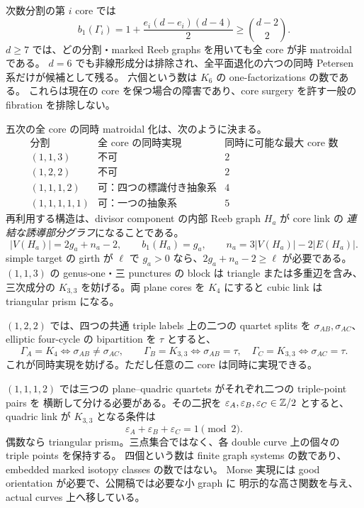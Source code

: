 \documentclass[11pt,a4paper]{article}
\begin{document}
次数分割の第 $i$ core では
\[
 b_1(\Gamma_i)=1+\frac{e_i(d-e_i)(d-4)}2\ge\binom{d-2}{2}.
\]
$d\ge7$ では、どの分割・marked Reeb graphs を用いても全 core が非 matroidal である。
$d=6$ でも非線形成分は排除され、全平面退化の六つの同時 Petersen 系だけが候補として残る。
六個という数は $K_6$ の one-factorizations の数である。
これらは現在の core を保つ場合の障害であり、core surgery を許す一般の fibration を排除しない。

五次の全 core の同時 matroidal 化は、次のように決まる。
\[
\begin{array}{c|c|c}
\text{分割}&\text{全 core の同時実現}&\text{同時に可能な最大 core 数}\\\hline
(1,1,3)&\text{不可}&2\\
(1,2,2)&\text{不可}&2\\
(1,1,1,2)&\text{可：四つの標識付き抽象系}&4\\
(1,1,1,1,1)&\text{可：一つの抽象系}&5
\end{array}
\]
再利用する構造は、divisor component の内部 Reeb graph $H_a$ が core link の
\emph{連結な誘導部分グラフ}になることである。
\[
 |V(H_a)|=2g_a+n_a-2,\qquad b_1(H_a)=g_a,
 \qquad n_a=3|V(H_a)|-2|E(H_a)|.
\]
simple target の girth が $\ell$ で $g_a>0$ なら、$2g_a+n_a-2\ge\ell$ が必要である。
$(1,1,3)$ の genus-one・三 punctures の block は triangle または多重辺を含み、
三次成分の $K_{3,3}$ を妨げる。両 plane cores を $K_4$ にすると cubic link は triangular prism になる。

$(1,2,2)$ では、四つの共通 triple labels 上の二つの quartet splits を
$\sigma_{AB},\sigma_{AC}$、elliptic four-cycle の bipartition を $\tau$ とすると、
\[
 \Gamma_A=K_4\Longleftrightarrow\sigma_{AB}\ne\sigma_{AC},\qquad
 \Gamma_B=K_{3,3}\Longleftrightarrow\sigma_{AB}=\tau,
 \quad\Gamma_C=K_{3,3}\Longleftrightarrow\sigma_{AC}=\tau.
\]
これが同時実現を妨げる。ただし任意の二 core は同時に実現できる。

$(1,1,1,2)$ では三つの plane--quadric quartets がそれぞれ二つの triple-point pairs を
横断して分ける必要がある。その二択を $\varepsilon_A,\varepsilon_B,\varepsilon_C\in\mathbb Z/2$ とすると、
quadric link が $K_{3,3}$ となる条件は
\[
 \varepsilon_A+\varepsilon_B+\varepsilon_C=1\pmod2.
\]
偶数なら triangular prism。三点集合ではなく、各 double curve 上の個々の triple points を保持する。
四個という数は finite graph systems の数であり、embedded marked isotopy classes の数ではない。
Morse 実現には good orientation が必要\cite{MichalakReeb}で、公開稿では必要な小 graph に
明示的な高さ関数を与え、actual curves 上へ移している。
\end{document}

